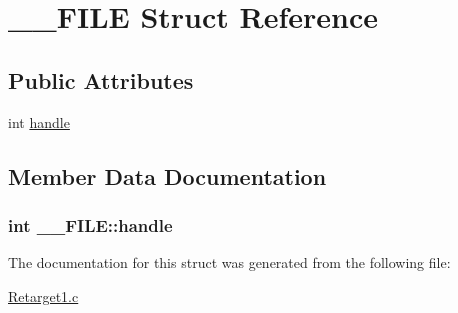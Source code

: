 \hypertarget{struct_____f_i_l_e}{
\section{\_\-\_\-FILE Struct Reference}
\label{da/d3e/struct_____f_i_l_e}
}
\subsection*{Public Attributes}
\begin{DoxyCompactItemize}
\item 
int \hyperlink{struct_____f_i_l_e_ac65d6afc3b2c74e74d56195829a1626f}{handle}
\end{DoxyCompactItemize}


\subsection{Member Data Documentation}
\hypertarget{struct_____f_i_l_e_ac65d6afc3b2c74e74d56195829a1626f}{
\subsubsection[{handle}]{\setlength{\rightskip}{0pt plus 5cm}int {\bf \_\-\_\-FILE::handle}}}
\label{da/d3e/struct_____f_i_l_e_ac65d6afc3b2c74e74d56195829a1626f}


The documentation for this struct was generated from the following file:\begin{DoxyCompactItemize}
\item 
\hyperlink{_retarget1_8c}{Retarget1.c}\end{DoxyCompactItemize}

